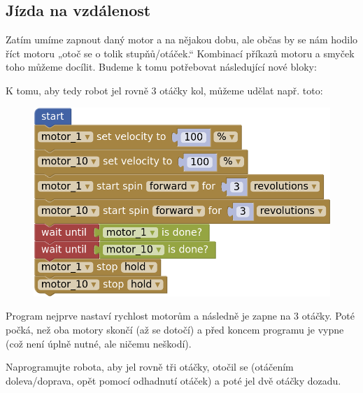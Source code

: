 \documentclass[../main.tex]{subfiles}
\begin{document}
	\subsection{Jízda na vzdálenost}\label{cha:distanceride}
	Zatím umíme zapnout daný motor a na nějakou dobu, ale občas by se nám hodilo říct motoru „otoč se o tolik stupňů/otáček.“ Kombinací příkazů motoru a smyček toho můžeme docílit. Budeme k tomu potřebovat následující nové bloky:
	\begin{itemize}
		\blockMotorDistance
		\blockMotorVelocity
		\blockWaitUntil
		\blockMotorDone
	\end{itemize}

	K tomu, aby tedy robot jel rovně 3 otáčky kol, můžeme udělat např. toto:

	\begin{figure}
		\centering
		\begin{minipage}{0.5\textwidth}
			\includegraphics[width=\linewidth]{Images/02/sol.png}
		\end{minipage}
	\end{figure}

	Program nejprve nastaví rychlost motorům a následně je zapne na $3$ otáčky. Poté počká, než oba motory skončí (až se dotočí) a před koncem programu je vypne (což není úplně nutné, ale ničemu neškodí).

	\begin{question}
		Naprogramujte robota, aby jel rovně tři otáčky, otočil se (otáčením doleva/doprava, opět pomocí odhadnutí otáček) a poté jel dvě otáčky dozadu.
	\end{question}
\end{document}
